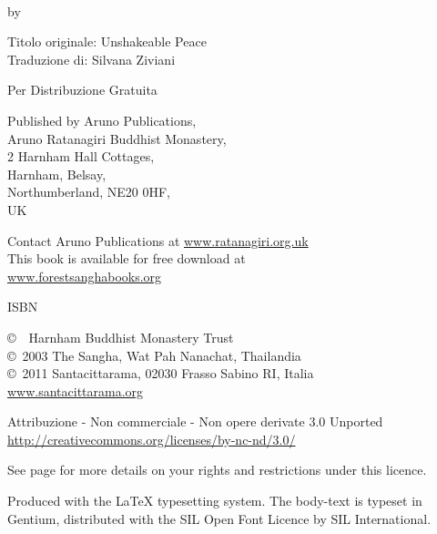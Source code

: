 {\small\setlength{\parskip}{0.8em}\setlength{\parindent}{0em}%
{\raggedright%

\thetitle\\
by \theauthor

Titolo originale: Unshakeable Peace\\
Traduzione di: Silvana Ziviani

Per Distribuzione Gratuita

Published by Aruno Publications,\\
Aruno Ratanagiri Buddhist Monastery,\\
2 Harnham Hall Cottages,\\
Harnham, Belsay,\\
Northumberland, NE20 0HF,\\
UK

Contact Aruno Publications at \href{http://ratanagiri.org.uk}{www.ratanagiri.org.uk}\\

This book is available for free download at\\
\href{http://forestsanghabooks.org/}{www.forestsanghabooks.org}

ISBN \theISBN

\copyright\ \the\year\ Harnham Buddhist Monastery Trust\\
\copyright\ 2003 The Sangha, Wat Pah Nanachat, Thailandia\\
\copyright\ 2011 Santacittarama, 02030 Frasso Sabino RI, Italia\\
\href{http://www.santacittarama.org/}{www.santacittarama.org}

\vfill

{\footnotesize
Attribuzione - Non commerciale - Non opere derivate 3.0 Unported\\
\href{http://creativecommons.org/licenses/by-nc-nd/3.0/}{http://creativecommons.org/licenses/by-nc-nd/3.0/}

See page \pageref{copyright-details} for more details on your rights and restrictions under this licence.

Produced with the {\selectfont\LaTeX} typesetting system. The body-text is typeset in Gentium, distributed with the SIL Open Font Licence by SIL International.

\theEditionInfo\\
\thePrintedByInfo

}
}}


